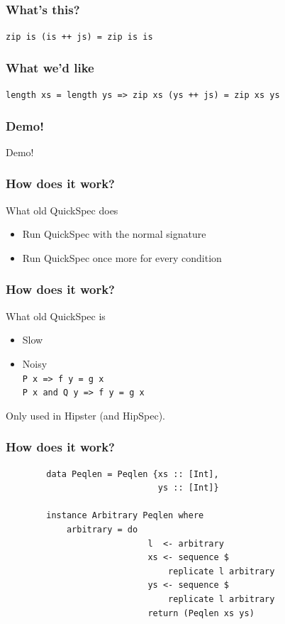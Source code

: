 \documentclass{beamer}
\begin{document}
\begin{frame}
    \frametitle{What's this?}
        \Large{\centerline{\texttt{zip is (is ++ js) = zip is is}}}
\end{frame}

\begin{frame}
    \frametitle{What we'd like}
        \centerline{\texttt{length xs = length ys => zip xs (ys ++ js) = zip xs ys}}
\end{frame}

\begin{frame}
    \frametitle{Demo!}
        \Huge{\centerline{Demo!}}
\end{frame}

\begin{frame}
    \frametitle{How does it work?}
        What old QuickSpec does
        \begin{itemize}
            \item Run QuickSpec with the normal signature 
            \item Run QuickSpec once more for every condition 
        \end{itemize}
\end{frame}

\begin{frame}
    \frametitle{How does it work?}
        What old QuickSpec is
        \begin{itemize}
            \item Slow
            \item Noisy\\
                \texttt{P x => f y         = g x}\\
                \texttt{P x and Q y => f y = g x}
        \end{itemize}
        Only used in Hipster (and HipSpec).
\end{frame}

\begin{frame}[fragile]
    \frametitle{How does it work?}
    \begin{verbatim}
        data Peqlen = Peqlen {xs :: [Int],
                              ys :: [Int]}

        instance Arbitrary Peqlen where
            arbitrary = do
                            l  <- arbitrary 
                            xs <- sequence $
                                replicate l arbitrary
                            ys <- sequence $
                                replicate l arbitrary
                            return (Peqlen xs ys)
        \end{verbatim}
\end{frame}
\end{document}
